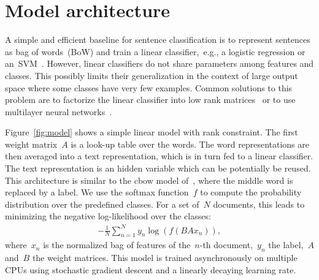 \documentclass[11pt,letterpaper]{article}
\begin{document}


\section{Model architecture}

A simple and efficient baseline for sentence classification is to represent
sentences as bag of words~(BoW) and train a linear classifier,~e.g., a logistic
regression or an~SVM~\cite{joachims1998text,fan2008liblinear}.
However, linear classifiers do not share parameters among features and classes.
This possibly limits their generalization in the context of large output space
where some classes have very few examples.
Common solutions to this problem are to factorize the linear classifier into low rank
matrices~\cite{schutze1992dimensions,mikolov2013efficient} or to use multilayer neural
networks~\cite{collobert2008unified,zhang2015character}. 

Figure~\ref{fig:model} shows a simple linear model with rank constraint. The first
weight matrix~$A$ is a look-up table over the words. The
word representations are then averaged into a text representation, 
which is in turn fed to a linear classifier. The text representation
is an hidden variable which can be potentially be reused. This
architecture is similar to the cbow model of~,
where the middle word is replaced by a label.
We use the softmax function~$f$ to compute the probability distribution over
the predefined classes. For a set of~$N$ documents, this leads to minimizing
the negative log-likelihood over the classes: 
\begin{eqnarray*}
-\frac{1}{N} \sum_{n=1}^N y_n \log( f (BAx_n)),
\end{eqnarray*}
where~$x_n$ is the normalized bag of features of the~$n$-th document,~$y_n$ the label,~$A$ and~$B$ the weight matrices.
This model is trained asynchronously on multiple CPUs using stochastic gradient descent and a linearly decaying
learning rate.
\end{document}

